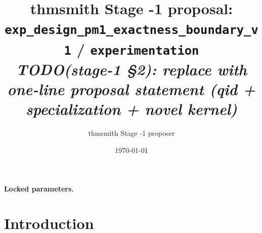 \documentclass[11pt]{article}
\title{thmsmith Stage -1 proposal: \texttt{exp\_design\_pm1\_exactness\_boundary\_v1} / \texttt{experimentation}%
  \\ \large\textit{TODO(stage-1 \S2): replace with one-line proposal statement (qid + specialization + novel kernel)}}
\author{thmsmith Stage -1 proposer}
\date{\today}
\theoremstyle{definition}
\theoremstyle{plain}
\theoremstyle{remark}
\begin{document}
\maketitle


\paragraph{Locked parameters.}

\begin{abstract}
\end{abstract}

\section{Introduction}
%
%
%
%
\end{document}
